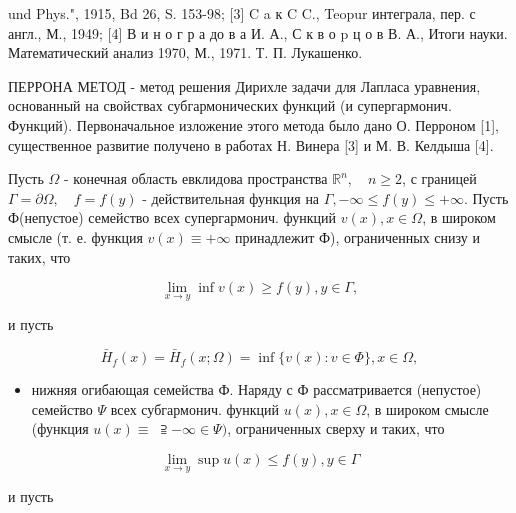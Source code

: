 \documentclass[10pt]{article}
\begin{document}
und Phys.", 1915, Bd 26, S. 153-98; [3] C a к C C., Teopur интеграла, пер. с англ., М., 1949; [4] В и н о г р а до в а И. А., С к в о p ц о в В. А., Итоги науки. Математический анализ 1970, М., 1971. Т. П. Лукашенко.



ПЕРРОНА МЕТОД - метод решения Дирихле задачи для Лапласа уравнения, основанный на свойствах субгармонических функций (и супергармонич. Функций). Первоначальное изложение этого метода было дано О. Перроном [1], существенное развитие получено в работах Н. Винера [3] и М. В. Келдыша [4].



Пусть $\Omega$ - конечная область евклидова пространства $\mathbb{R}^{n}, \quad n \geqslant 2$, с границей $\Gamma=\partial \Omega, \quad f=f(y)$ - действительная функция на $\Gamma,-\infty \leqslant f(y) \leqslant+\infty$. Пусть Ф(непустое) семейство всех супергармонич. функций $v(x), x \in \Omega$, в широком смысле (т. е. функция $v(x) \equiv+\infty$ принадлежит Ф), ограниченных снизу и таких, что



\[

\lim _{x \rightarrow y} \inf v(x) \geqslant f(y), y \in \Gamma,

\]



и пусть



\[

\bar{H}_{f}(x)=\bar{H}_{f}(x ; \Omega)=\inf \{v(x): v \in \Phi\}, x \in \Omega,

\]



\begin{itemize}

  \item нижняя огибающая семейства Ф. Наряду с Ф рассматривается (непустое) семейство $\Psi$ всех субгармонич. функций $u(x), x \in \Omega$, в широком смысле (функция $u(x) \equiv$ $\supseteqq-\infty \in \Psi)$, ограниченных сверху и таких, что

\end{itemize}



\[

\lim _{x \rightarrow y} \sup u(x) \leqslant f(y), y \in \Gamma

\]



и пусть
\end{document}
